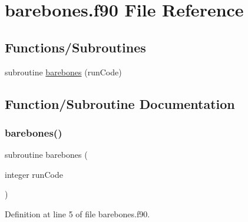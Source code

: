 \hypertarget{barebones_8f90}{}\section{barebones.\+f90 File Reference}
\label{barebones_8f90}
\subsection*{Functions/\+Subroutines}
\begin{DoxyCompactItemize}
\item 
subroutine \hyperlink{barebones_8f90_a32de3ce5a1675cc875c4cce961663fa6}{barebones} (run\+Code)
\end{DoxyCompactItemize}


\subsection{Function/\+Subroutine Documentation}
\hypertarget{barebones_8f90_a32de3ce5a1675cc875c4cce961663fa6}{}\label{barebones_8f90_a32de3ce5a1675cc875c4cce961663fa6} 
\subsubsection{\texorpdfstring{barebones()}{barebones()}}
{\footnotesize\ttfamily subroutine barebones (\begin{DoxyParamCaption}\item[{integer}]{run\+Code }\end{DoxyParamCaption})}



Definition at line 5 of file barebones.\+f90.

